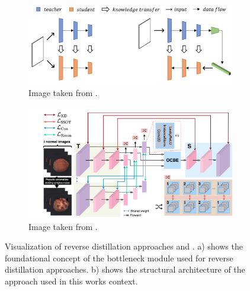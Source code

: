 \begin{figure}[htbp]
    \captionsetup[subfigure]{justification=centering}
    \centering
    \begin{subfigure}[b]{0.4\textwidth} %
        \centering
        \includegraphics[width=\textwidth]{figures/revdist_bottleneck.png}
        \caption{Image taken from \cite{Deng_2022basicrevdist}.}
        \label{fig:revdistbottleneck}
    \end{subfigure}
    \hspace{0.05\textwidth} %
    \begin{subfigure}[b]{0.4\textwidth} %
        \centering
        \includegraphics[width=\textwidth]{figures/revdistpipeline.png}
        \caption{Image taken from \cite{revdist2023}.}
        \label{fig:revdistpipeline}
    \end{subfigure}
    
    \caption{Visualization of reverse distillation approaches \cite{Deng_2022basicrevdist} and \cite{revdist2023}. a) shows 
    the foundational concept of the bottleneck module used for reverse distillation approaches. b) shows the structural 
    architecture of the approach used in this works context.}
    \label{fig:revdistviz}
\end{figure}


